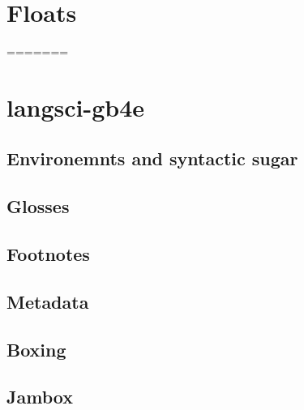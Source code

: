 \documentclass[output=book
	      ,nonflat
	      ,modfonts
	      ]{langsci/langscibook}
\begin{document}
\section{Floats}

=======
\maketitle
 
\section{langsci-gb4e}
\subsection{Environemnts and syntactic sugar}

% 







\writechapterpages
\subsection{Glosses}






\writechapterpages
\subsection{Footnotes}




\subsection{Metadata}

\subsection{Boxing}

% 
\subsection{Jambox}

\end{document}
